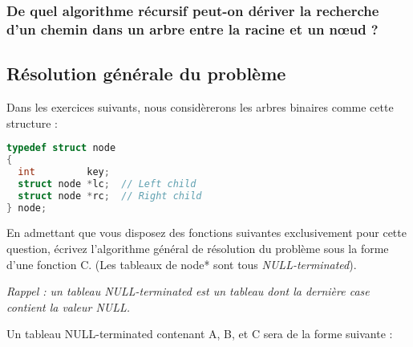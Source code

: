 \documentclass[11pt,a4paper]{article}
\begin{document}
%


\subsubsection{De quel algorithme récursif peut-on dériver la recherche d'un chemin dans un arbre entre la racine et un nœud ?}


\bigskip

\clearpage

\subsection{Résolution générale du problème}

Dans les exercices suivants, nous considèrerons les arbres binaires comme cette structure  :

\begin{center}
\begin{lstlisting}[language=C,commentstyle=\color{teal}\ttfamily,morekeywords={node}]
typedef struct node
{
  int         key;
  struct node *lc;  // Left child
  struct node *rc;  // Right child
} node;
\end{lstlisting}
\end{center}

\vspace*{-0.5cm}

En admettant que vous disposez des fonctions suivantes exclusivement pour cette question, écrivez l'algorithme général de résolution du problème sous la forme d'une fonction C.
(Les tableaux de node* sont tous \textit{NULL-terminated}).

\medskip

\textit{Rappel : un tableau NULL-terminated est un tableau dont la dernière case contient la valeur NULL.}

\medskip

\setlength\fboxrule{0.2pt}
Un tableau NULL-terminated contenant A, B, et C sera de la forme suivante : 
\setlength\fboxrule{0.4pt}
\end{document}
